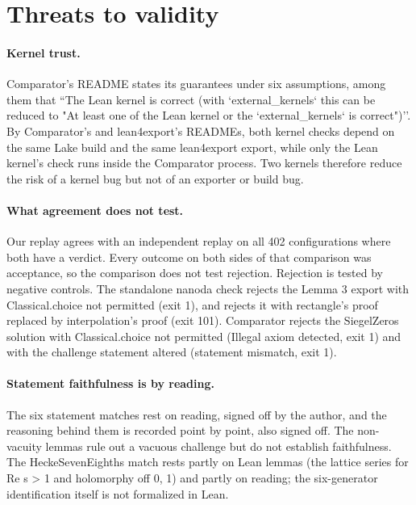 \section{Threats to validity}\label{sec:threats}

\paragraph{Kernel trust.}
Comparator's README states its guarantees under six assumptions, among them that ``The Lean kernel is correct (with `external\_kernels` this can be reduced to "At least one of the Lean kernel or the `external\_kernels` is correct")''. %
By Comparator's and lean4export's READMEs, both kernel checks depend on the same Lake build and the same lean4export export, while only the Lean kernel's check runs inside the Comparator process. %
Two kernels therefore reduce the risk of a kernel bug but not of an exporter or build bug. %

\paragraph{What agreement does not test.}
Our replay agrees with an independent replay on all 402 configurations where both have a verdict. %
Every outcome on both sides of that comparison was acceptance, so the comparison does not test rejection. %
Rejection is tested by negative controls. %
The standalone nanoda check rejects the Lemma 3 export with Classical.choice not permitted (exit 1), and rejects it with rectangle's proof replaced by interpolation's proof (exit 101). %
Comparator rejects the SiegelZeros solution with Classical.choice not permitted (Illegal axiom detected, exit 1) and with the challenge statement altered (statement mismatch, exit 1). %

\paragraph{Statement faithfulness is by reading.}
The six statement matches rest on reading, signed off by the author, and the reasoning behind them is recorded point by point, also signed off. %
The non-vacuity lemmas rule out a vacuous challenge but do not establish faithfulness. %
The HeckeSevenEighths match rests partly on Lean lemmas (the lattice series for Re s > 1 and holomorphy off {0, 1}) and partly on reading; the six-generator identification itself is not formalized in Lean. %

